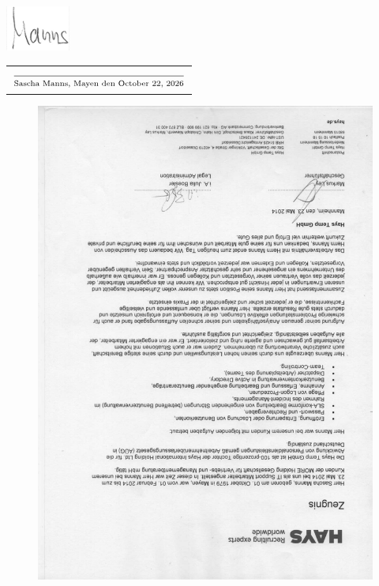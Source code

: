 \documentclass[a4paper,latin]{friggeri-cv} %
\begin{document}
\begin{center}
\includegraphics[scale=0.7]{../Pictures/signatur.png} \\
\begin{tabular}{@{}l@{}}
\\ $\frac{}{\strut\textnormal{Sascha Manns, Mayen den \today}}$
\end{tabular}
\end{center}

\begin{figure}  
  \includegraphics[page=1,scale=0.7,angle=180]{../Appendix/Employers_Reference/hays.pdf}
\end{figure}

%







\end{document}
